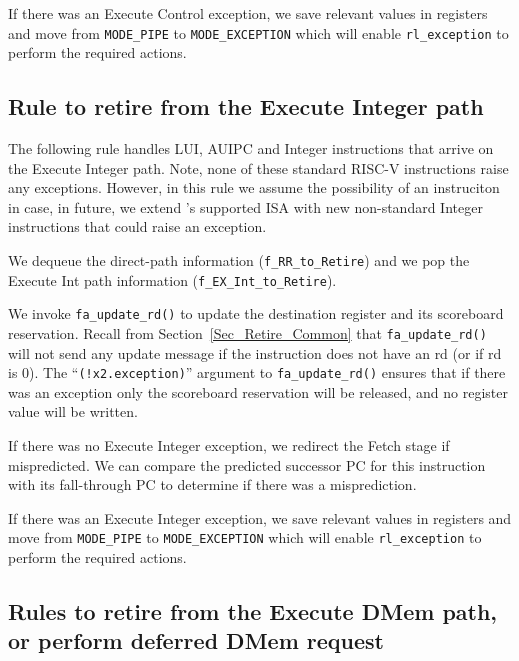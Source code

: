 If there was an Execute Control exception, we save relevant values in
registers and move from \verb|MODE_PIPE| to \verb|MODE_EXCEPTION|
which will enable \verb|rl_exception| to perform the required actions.


\subsection{Rule to retire from the Execute Integer path}

\label{Sec_Fife_Retire_Int}

The following rule handles LUI, AUIPC and Integer instructions that
arrive on the Execute Integer path.  Note, none of these standard
RISC-V instructions raise any exceptions.  However, in this rule we
assume the possibility of an instruciton in case, in future, we extend
{\FIFE}'s supported ISA with new non-standard Integer instructions that
could raise an exception.


We dequeue the direct-path information (\verb|f_RR_to_Retire|) and we
pop the Execute Int path information (\verb|f_EX_Int_to_Retire|).

We invoke \verb|fa_update_rd()| to update the destination register and
its scoreboard reservation.  Recall from
Section~\ref{Sec_Retire_Common} that \verb|fa_update_rd()| will not
send any update message if the instruction does not have an rd (or if
rd is 0).  The ``\verb|(!x2.exception)|'' argument to
\verb|fa_update_rd()| ensures that if there was an exception only the
scoreboard reservation will be released, and no register value will be
written.

If there was no Execute Integer exception, we redirect the Fetch stage
if mispredicted.  We can compare the predicted successor PC for this
instruction with its fall-through PC to determine if there was a
misprediction.

If there was an Execute Integer exception, we save relevant values in
registers and move from \verb|MODE_PIPE| to \verb|MODE_EXCEPTION|
which will enable \verb|rl_exception| to perform the required actions.


\subsection{Rules to retire from the Execute DMem path, or perform deferred DMem request}

